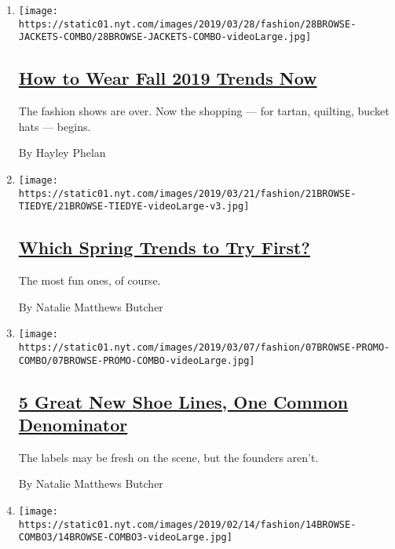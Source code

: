 \begin{enumerate}
\def\labelenumi{\arabic{enumi}.}
\item
  \texttt{[image: https://static01.nyt.com/images/2019/03/28/fashion/28BROWSE-JACKETS-COMBO/28BROWSE-JACKETS-COMBO-videoLarge.jpg]}

  \hypertarget{how-to-wear-fall-2019-trends-now}{%
  \subsection{\texorpdfstring{\href{/2019/03/27/style/how-to-wear-fall-2019-trends-now.html}{How
  to Wear Fall 2019 Trends
  Now}}{How to Wear Fall 2019 Trends Now}}\label{how-to-wear-fall-2019-trends-now}}

  The fashion shows are over. Now the shopping --- for tartan, quilting,
  bucket hats --- begins.

  By Hayley Phelan
\item
  \texttt{[image: https://static01.nyt.com/images/2019/03/21/fashion/21BROWSE-TIEDYE/21BROWSE-TIEDYE-videoLarge-v3.jpg]}

  \hypertarget{which-spring-trends-to-try-first}{%
  \subsection{\texorpdfstring{\href{/2019/03/20/style/spring-trends.html}{Which
  Spring Trends to Try
  First?}}{Which Spring Trends to Try First?}}\label{which-spring-trends-to-try-first}}

  The most fun ones, of course.

  By Natalie Matthews Butcher
\item
  \texttt{[image: https://static01.nyt.com/images/2019/03/07/fashion/07BROWSE-PROMO-COMBO/07BROWSE-PROMO-COMBO-videoLarge.jpg]}

  \hypertarget{5-great-new-shoe-lines-one-common-denominator}{%
  \subsection{\texorpdfstring{\href{/2019/03/13/style/5-great-new-shoe-lines-one-common-denominator.html}{5
  Great New Shoe Lines, One Common
  Denominator}}{5 Great New Shoe Lines, One Common Denominator}}\label{5-great-new-shoe-lines-one-common-denominator}}

  The labels may be fresh on the scene, but the founders aren't.

  By Natalie Matthews Butcher
\item
  \texttt{[image: https://static01.nyt.com/images/2019/02/14/fashion/14BROWSE-COMBO3/14BROWSE-COMBO3-videoLarge.jpg]}


\end{enumerate}

